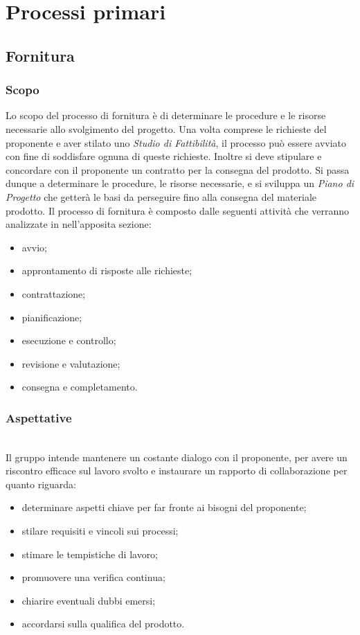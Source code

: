 \section{Processi primari}

\subsection{Fornitura}
	\subsubsection{Scopo}
	Lo scopo del processo di fornitura è di determinare le procedure e le risorse 
	necessarie allo svolgimento del progetto. Una volta comprese le richieste del 
	proponente e aver stilato uno \textit{Studio di Fattibilità}, il processo può 
	essere avviato con fine di soddisfare ognuna di queste richieste. Inoltre si 
	deve stipulare e concordare con il proponente un contratto per la consegna del 
	prodotto. Si passa dunque a determinare le procedure, le risorse necessarie, e 
	si sviluppa un \textit{Piano di Progetto} che getterà le basi da perseguire fino 
	alla consegna del materiale prodotto.
	Il processo di fornitura è composto dalle seguenti attività che verranno 
	analizzate in nell'apposita sezione:
		\begin{itemize}
			\item avvio;
			\item approntamento di risposte alle richieste;
			\item contrattazione;
			\item pianificazione;
			\item esecuzione e controllo;
			\item revisione e valutazione;
			\item consegna e completamento.
		\end{itemize}
	
	\subsubsection{Aspettative} \mbox{}\\ 
	\noindent Il gruppo intende mantenere un costante dialogo con il proponente, per avere un 
	riscontro efficace sul lavoro svolto e instaurare un rapporto di collaborazione 
	per quanto riguarda:
		\begin{itemize}
			\item determinare aspetti chiave per far fronte ai bisogni del proponente;
			\item stilare requisiti e vincoli sui processi;
			\item stimare le tempistiche di lavoro;
			\item promuovere una verifica continua;
			\item chiarire eventuali dubbi emersi;
			\item accordarsi sulla qualifica del prodotto.
		\end{itemize}
	
